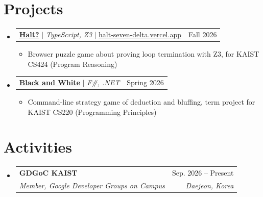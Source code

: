 \documentclass[letterpaper,11pt]{article}
\makeatletter
\newcommand{\resumeItem}[1]{
  \item\small{
    {#1 \vspace{-2pt}}
  }
}
\newcommand{\resumeSubheading}[4]{
  \vspace{-2pt}\item
    \begin{tabular*}{0.97\textwidth}[t]{l@{\extracolsep{\fill}}r}
      \textbf{#1} & #2 \\
      \textit{\small#3} & \textit{\small #4} \\
    \end{tabular*}\vspace{-7pt}
}
\newcommand{\resumeProjectHeading}[2]{
    \item
    \begin{tabular*}{0.97\textwidth}{l@{\extracolsep{\fill}}r}
      \small#1 & #2 \\
    \end{tabular*}\vspace{-7pt}
}
\newcommand{\resumeSubHeadingListStart}{\begin{itemize}[leftmargin=0.15in, label={}]}
\newcommand{\resumeSubHeadingListEnd}{\end{itemize}}
\newcommand{\resumeItemListStart}{\begin{itemize}}
\newcommand{\resumeItemListEnd}{\end{itemize}\vspace{-5pt}}
\makeatother
\begin{document}
\section{Projects}
    \resumeSubHeadingListStart
      \resumeProjectHeading
          {\textbf{\href{https://github.com/jkkms/halt}{Halt?}} $|$ \emph{TypeScript, Z3} $|$ \href{https://halt-seven-delta.vercel.app/}{\underline{halt-seven-delta.vercel.app}}}{Fall 2026}
          \resumeItemListStart
            \resumeItem{Browser puzzle game about proving loop termination with Z3, for KAIST CS424 (Program Reasoning)}
          \resumeItemListEnd
      \resumeProjectHeading
          {\textbf{\href{https://github.com/jkkms/Black-and-White}{Black and White}} $|$ \emph{F\#, .NET}}{Spring 2026}
          \resumeItemListStart
            \resumeItem{Command-line strategy game of deduction and bluffing, term project for KAIST CS220 (Programming Principles)}
          \resumeItemListEnd
    \resumeSubHeadingListEnd


\section{Activities}
  \resumeSubHeadingListStart
    \resumeSubheading
      {GDGoC KAIST}{Sep. 2026 -- Present}
      {Member, Google Developer Groups on Campus}{Daejeon, Korea}
  \resumeSubHeadingListEnd


\end{document}
